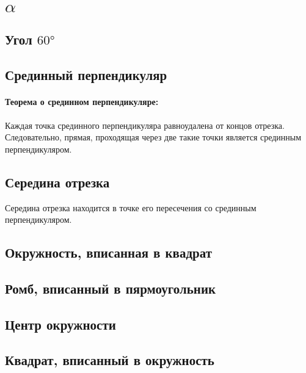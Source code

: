 \section{$\alpha $}
\subsection{Угол $60°$}
\subsection{Срединный перпендикуляр}
\paragraph{Теорема о срединном перпендикуляре:} Каждая точка срединного перпендикуляра равноудалена от концов отрезка.
Следовательно, прямая, проходящая через две такие точки является срединным перпендикуляром.
\subsection{Середина отрезка}
Середина отрезка находится в точке его пересечения со срединным перпендикуляром.
\subsection{Окружность, вписанная в квадрат}
\subsection{Ромб, вписанный в пярмоугольник}
\subsection{Центр окружности}
\subsection{Квадрат, вписанный в окружность}